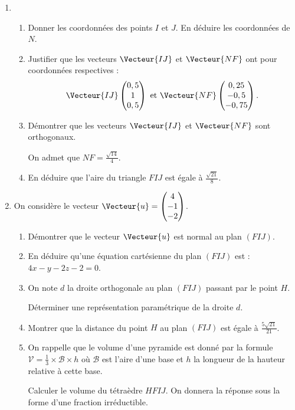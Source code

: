 \begin{enumerate}
	\item 
	\begin{enumerate}
		\item Donner les coordonnées des points $I$ et $J$. En déduire les coordonnées de $N$.
		\item Justifier que les vecteurs $\Vecteur{IJ}$ et $\Vecteur{NF}$ ont pour coordonnées respectives :%
		\[ \Vecteur{IJ} \begin{pmatrix} 0,5 \\ 1 \\ 0,5 \end{pmatrix} \text{ et } \Vecteur{NF} \begin{pmatrix} 0,25 \\ -0,5 \\ -0,75\end{pmatrix}.\]
		\item Démontrer que les vecteurs $\Vecteur{IJ}$ et $\Vecteur{NF}$ sont orthogonaux.
		
		\smallskip
		
		On admet que $NF=\frac{\sqrt{14}}{4}$.
		\item En déduire que l'aire du triangle $FIJ$ est égale à $\frac{\sqrt{21}}{8}$.
	\end{enumerate}
	\item On considère le vecteur $\Vecteur{u} = \begin{pmatrix} 4 \\ -1 \\ -2 \end{pmatrix}$. 
	\begin{enumerate}
		\item Démontrer que le vecteur $\Vecteur{u}$ est normal au plan $(FIJ)$.
		\item En déduire qu'une équation cartésienne du plan $(FIJ)$ est : $4x - y - 2z - 2 = 0$.
		\item On note $d$ la droite orthogonale au plan $(FIJ)$ passant par le point $H$.
		
		Déterminer une représentation paramétrique de la droite $d$.
		\item Montrer que la distance du point $H$ au plan $(FIJ)$ est égale à $\frac{5\sqrt{21}}{21}$.
		\item On rappelle que le volume d’une pyramide est donné par la formule $\mathcal{V} = \frac13 \times \mathcal{B} \times h$ où $\mathcal{B}$ est l’aire d’une base et $h$ la longueur de la hauteur relative à cette base.
		
		\smallskip
		
		Calculer le volume du tétraèdre $HFIJ$. On donnera la réponse sous la forme d'une fraction irréductible.
	\end{enumerate}
\end{enumerate}